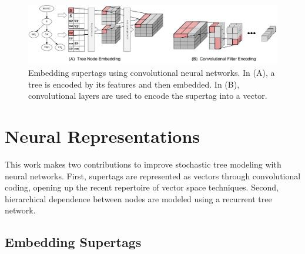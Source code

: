\documentclass[11pt]{article}
\begin{document}
\begin{figure}[tH!]
\centering
\includegraphics[width=\textwidth]{spineembed.pdf}
\caption{Embedding supertags using convolutional neural networks. In (A), a tree is encoded by its features and then embedded.
 In (B), convolutional layers are used to encode the supertag into a vector.}
 \label{fig:spineembedding}
\end{figure}

\section{Neural Representations}
\label{sec:neural}

%
%
This work makes two contributions to improve stochastic tree modeling with neural networks.
%
First, supertags are represented as vectors through convolutional coding,
opening up the recent repertoire of vector space techniques.
%
Second, hierarchical dependence between nodes are modeled using a recurrent tree
network.
%


\subsection{Embedding Supertags}
\end{document}
